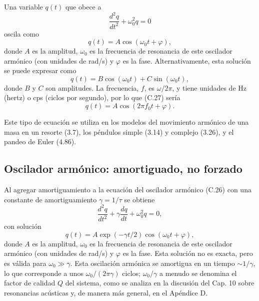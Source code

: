\documentclass[12pt,a4paper]{book}
\begin{document}
Una variable $q(t)$ que obece a
\begin{equation}
\frac{d^2q}{dt^2} + \omega_0^2 q = 0
\label{eq:C.26}
\end{equation}
oscila como
\begin{equation}
q(t) = A \cos(\omega_0 t + \varphi),
\label{eq:C.27}
\end{equation}
donde $A$ es la amplitud, $\omega_0$ es la frecuencia de resonancia de este oscilador armónico (con unidades de rad/s) y $\varphi$ es la fase. Alternativamente, esta solución se puede expresar como
\begin{equation}
q(t) = B \cos(\omega_0 t) + C \sin(\omega_0 t),
\label{eq:C.28}
\end{equation}
donde $B$ y $C$ son amplitudes. La frecuencia, $f$, es $\omega/2\pi$, y tiene unidades de Hz (hertz) o cps (ciclos por segundo), por lo que (C.27) sería
\begin{equation}
q(t) = A \cos(2\pi f_0 t + \varphi).
\label{eq:C.29}
\end{equation}

Este tipo de ecuación se utiliza en los modelos del movimiento armónico de una masa en un resorte (3.7), los péndulos simple (3.14) y complejo (3.26), y el pandeo de Euler (4.86).

\subsection*{Oscilador armónico: amortiguado, no forzado}

Al agregar amortiguamiento a la ecuación del oscilador armónico (C.26) con una constante de amortiguamiento $\gamma = 1/\tau$ se obtiene
\begin{equation}
\frac{d^2q}{dt^2} + \gamma \frac{dq}{dt} + \omega_0^2 q = 0,
\label{eq:C.30}
\end{equation}
con solución
\begin{equation}
q(t) = A \exp(-\gamma t/2) \cos(\omega_0 t + \varphi),
\label{eq:C.31}
\end{equation}
donde $A$ es la amplitud, $\omega_0$ es la frecuencia de resonancia de este oscilador armónico (con unidades de rad/s) y $\varphi$ es la fase. Esta solución no es exacta, pero es válida para $\omega_0 \gg \gamma$. Esta oscilación armónica se amortigua en un tiempo $\sim 1/\gamma$, lo que corresponde a unos $\omega_0/(2\pi\gamma)$ ciclos; $\omega_0/\gamma$ a menudo se denomina el factor de calidad $Q$ del sistema, como se analiza en la discusión del Cap. 10 sobre resonancias acústicas y, de manera más general, en el Apéndice D.
\end{document}
